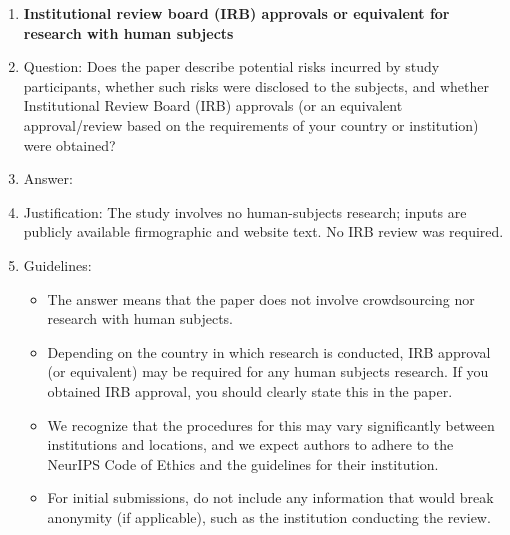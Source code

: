 \documentclass{article}
\begin{document}
\begin{enumerate}
\item {\bf Institutional review board (IRB) approvals or equivalent for research with human subjects}
    \item[] Question: Does the paper describe potential risks incurred by study participants, whether such risks were disclosed to the subjects, and whether Institutional Review Board (IRB) approvals (or an equivalent approval/review based on the requirements of your country or institution) were obtained?
    \item[] Answer: \answerNA{}
    \item[] Justification: The study involves no human-subjects research; inputs are publicly available firmographic and website text. No IRB review was required.
    \item[] Guidelines:
    \begin{itemize}
        \item The answer \answerNA{} means that the paper does not involve crowdsourcing nor research with human subjects.
        \item Depending on the country in which research is conducted, IRB approval (or equivalent) may be required for any human subjects research. If you obtained IRB approval, you should clearly state this in the paper.
        \item We recognize that the procedures for this may vary significantly between institutions and locations, and we expect authors to adhere to the NeurIPS Code of Ethics and the guidelines for their institution.
        \item For initial submissions, do not include any information that would break anonymity (if applicable), such as the institution conducting the review.
    \end{itemize}


\end{enumerate}
\end{document}
